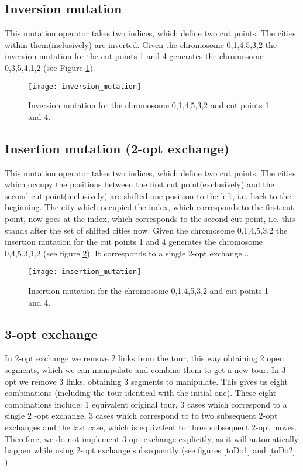 \documentclass[a4paper, 12pt, headings=standardclasses]{scrartcl}
\begin{document}
\subsection{Inversion mutation}

This mutation operator \cite{akay2013recent} takes two indices, which define two cut points. The cities within them(inclusively) are inverted. Given the chromosome 0,1,4,5,3,2 the inversion mutation for the cut points 1 and 4 generates the chromosome 0,3,5,4,1,2 (see Figure \ref{inversion_mutation}).

\begin{figure}[!ht]
	\centering
	\texttt{[image: inversion\_mutation]}
	\caption{Inversion mutation for the chromosome 0,1,4,5,3,2 and cut points 1 and 4.}
	\label{inversion_mutation}
\end{figure}

\subsection{Insertion mutation (2-opt exchange)}
This mutation operator \cite{akay2013recent} takes two indices, which define two cut points. The cities which occupy the positions between the first cut point(exclusively) and the second cut point(inclusively) are shifted one position to the left, i.e. back to the beginning. The city which occupied the index, which corresponds to the first cut point, now goes at the index, which corresponds to the second cut point, i.e. this stands after the set of shifted cities now. Given the chromosome 0,1,4,5,3,2 the insertion mutation for the cut points 1 and 4 generates the chromosome 0,4,5,3,1,2 (see figure \ref{insertion_mutation}).
It corresponds to a single 2-opt exchange...

\begin{figure}[!ht]
	\centering
	\texttt{[image: insertion\_mutation]}
	\caption{Insertion mutation for the chromosome 0,1,4,5,3,2 and cut points 1 and 4.}
	\label{insertion_mutation}
\end{figure}

\subsection{3-opt exchange}

In 2-opt exchange we remove 2 links from the tour, this way obtaining 2 open segments, which we can manipulate and combine them to get a new tour. In 3-opt we remove 3 links, obtaining 3 segments to manipulate. This gives us eight combinations (including the tour identical with the initial one). These eight combinations include: 1 equivalent original tour,
3 cases which correspond to a single 2 -opt exchange, 3 cases which correspond to to two subsequent 2-opt exchanges and the last case, which is equivalent to three subsequent 2-opt moves. Therefore, we do not implement 3-opt exchange explicitly, as it will automatically happen while using 2-opt exchange subsequently (see figures \ref{toDo1} and \ref{toDo2} )
\end{document}
